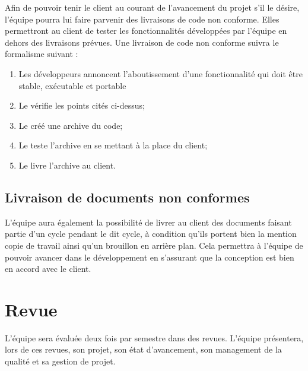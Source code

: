 Afin de pouvoir tenir le client au courant de l’avancement du projet s’il le désire, l’équipe \nomEquipe{} pourra lui faire parvenir des livraisons de code non conforme. Elles permettront au client de tester les fonctionnalités développées par l’équipe en dehors des livraisons prévues. Une livraison de code non conforme suivra le formalisme suivant :
\begin{enumerate}
\item Les développeurs annoncent l’aboutissement d’une fonctionnalité qui doit être stable, exécutable et portable 
\item Le \RD{} vérifie les points cités ci-dessus;
\item Le \RD{} créé une archive du code;
\item Le \CP{} teste l’archive en se mettant à la place du client;
\item Le \CP{} livre l’archive au client.

\end{enumerate}

\subsection{Livraison de documents non conformes}

L’équipe \nomEquipe{} aura également la possibilité de livrer au client des documents faisant partie d’un cycle pendant le dit cycle, à condition qu’ils portent bien la mention copie de travail ainsi qu’un \og brouillon \fg{} en arrière plan. Cela permettra à l’équipe de pouvoir avancer dans le développement en s’assurant que la conception est bien en accord avec le client.

\section{Revue}
\label{revue}

L’équipe \PICCourt sera évaluée deux fois par semestre dans des revues. L’équipe présentera, lors de ces revues, son projet, son état d’avancement, son management de la qualité et sa gestion de projet.



